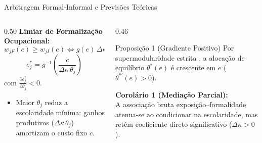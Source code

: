 \documentclass[aspectratio=169, 10pt]{beamer}
\begin{document}
\begin{frame}{Arbitragem Formal-Informal e Previsões Teóricas}
    \begin{columns}[T]
        \begin{column}{0.50\textwidth}
            \textbf{Limiar de Formalização Ocupacional:}
            \begin{equation*}
                w_{jF}(e) \ge w_{jI}(e) \iff g(e)\,\Delta\kappa\,\theta_j \ge c
            \end{equation*}
            \pause
            \begin{equation*}
                \boxed{e^*_j = g^{-1}\left(\frac{c}{\Delta\kappa\,\theta_j}\right)}
            \end{equation*}
            com $\frac{\partial e^*_j}{\partial \theta_j} < 0$.

            \begin{itemize}
                \item Maior $\theta_j$ reduz a escolaridade mínima: ganhos
                produtivos ($\Delta\kappa\,\theta_j$) amortizam o custo fixo $c$.
            \end{itemize}
        \end{column}

        \begin{column}{0.46\textwidth}
            \begin{block}{Proposição 1 (Gradiente Positivo)}
                Por supermodularidade estrita
                \citep{topkis1998supermodularity}, a alocação de
                equilíbrio $\theta^*(e)$ é crescente em $e$ ($\theta^{*\prime}(e) > 0$).
            \end{block}

            \vspace{0.3em}
            \textbf{Corolário 1 (Mediação Parcial):} \\
            A associação bruta exposição--formalidade atenua-se
            ao condicionar na escolaridade, mas retém coeficiente
            direto significativo ($\Delta\kappa > 0$).
        \end{column}
    \end{columns}
\end{frame}

\end{document}
